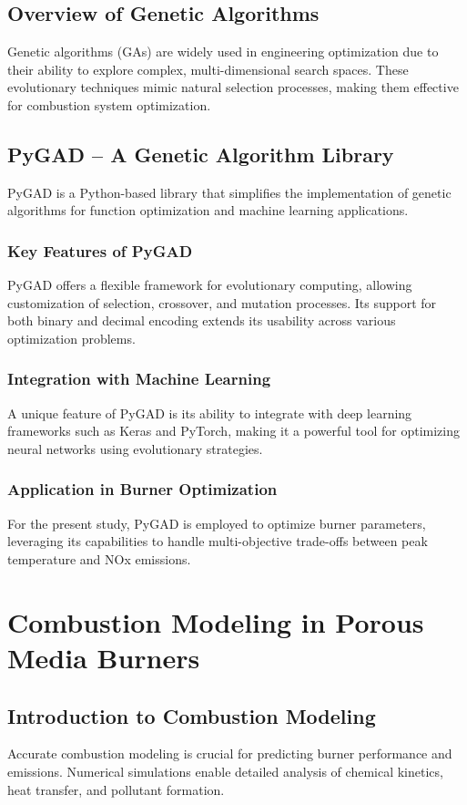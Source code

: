 \documentclass[12pt]{report}
\begin{document}
\subsection{Overview of Genetic Algorithms}
Genetic algorithms (GAs) are widely used in engineering optimization due to their ability to explore complex, multi-dimensional search spaces. These evolutionary techniques mimic natural selection processes, making them effective for combustion system optimization.

\subsection{PyGAD – A Genetic Algorithm Library}
PyGAD \cite{gad2021} is a Python-based library that simplifies the implementation of genetic algorithms for function optimization and machine learning applications.

\subsubsection{Key Features of PyGAD}
PyGAD offers a flexible framework for evolutionary computing, allowing customization of selection, crossover, and mutation processes. Its support for both binary and decimal encoding extends its usability across various optimization problems.

\subsubsection{Integration with Machine Learning}
A unique feature of PyGAD is its ability to integrate with deep learning frameworks such as Keras and PyTorch, making it a powerful tool for optimizing neural networks using evolutionary strategies.

\subsubsection{Application in Burner Optimization}
For the present study, PyGAD is employed to optimize burner parameters, leveraging its capabilities to handle multi-objective trade-offs between peak temperature and NOx emissions.

\section{Combustion Modeling in Porous Media Burners}

\subsection{Introduction to Combustion Modeling}
Accurate combustion modeling is crucial for predicting burner performance and emissions. Numerical simulations enable detailed analysis of chemical kinetics, heat transfer, and pollutant formation.
\end{document}
